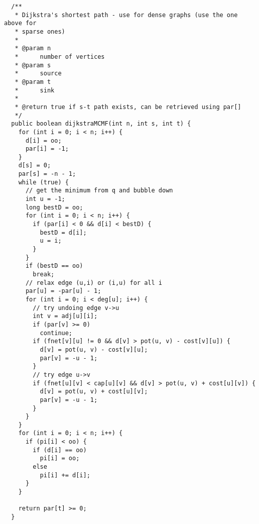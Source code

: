 \documentclass{article}
\begin{document}
  \begin{verbatim}
  /**
   * Dijkstra's shortest path - use for dense graphs (use the one above for
   * sparse ones)
   * 
   * @param n
   *      number of vertices
   * @param s
   *      source
   * @param t
   *      sink
   * 
   * @return true if s-t path exists, can be retrieved using par[]
   */
  public boolean dijkstraMCMF(int n, int s, int t) {
    for (int i = 0; i < n; i++) {
      d[i] = oo;
      par[i] = -1;
    }
    d[s] = 0;
    par[s] = -n - 1;
    while (true) {
      // get the minimum from q and bubble down
      int u = -1;
      long bestD = oo;
      for (int i = 0; i < n; i++) {
        if (par[i] < 0 && d[i] < bestD) {
          bestD = d[i];
          u = i;
        }
      }
      if (bestD == oo)
        break;
      // relax edge (u,i) or (i,u) for all i
      par[u] = -par[u] - 1;
      for (int i = 0; i < deg[u]; i++) {
        // try undoing edge v->u
        int v = adj[u][i];
        if (par[v] >= 0)
          continue;
        if (fnet[v][u] != 0 && d[v] > pot(u, v) - cost[v][u]) {
          d[v] = pot(u, v) - cost[v][u];
          par[v] = -u - 1;
        }
        // try edge u->v
        if (fnet[u][v] < cap[u][v] && d[v] > pot(u, v) + cost[u][v]) {
          d[v] = pot(u, v) + cost[u][v];
          par[v] = -u - 1;
        }
      }
    }
    for (int i = 0; i < n; i++) {
      if (pi[i] < oo) {
        if (d[i] == oo)
          pi[i] = oo;
        else
          pi[i] += d[i];
      }
    }

    return par[t] >= 0;
  }

    \end{verbatim}
\end{document}
